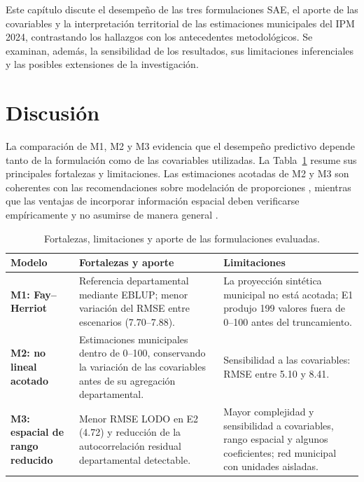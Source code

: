 \label{sec:discusion}

Este capítulo discute el desempeño de las tres formulaciones SAE, el aporte de las covariables y la interpretación territorial de las estimaciones municipales del IPM 2024, contrastando los hallazgos con los antecedentes metodológicos. Se examinan, además, la sensibilidad de los resultados, sus limitaciones inferenciales y las posibles extensiones de la investigación.

\section{Discusión}
\label{sec:discusion-resultados}

La comparación de M1, M2 y M3 evidencia que el desempeño predictivo depende tanto de la formulación como de las covariables utilizadas. La Tabla~\ref{tab:comparativa_modelos} resume sus principales fortalezas y limitaciones. Las estimaciones acotadas de M2 y M3 son coherentes con las recomendaciones sobre modelación de proporciones \cite{Janicki_2020,MolinaRao_2010,RaoMolina_2015}, mientras que las ventajas de incorporar información espacial deben verificarse empíricamente y no asumirse de manera general \cite{PratesiSalvati_2008,PratesiSalvati_2019}.

\begin{table}[!htbp]
\centering
\footnotesize
\caption{Fortalezas, limitaciones y aporte de las formulaciones evaluadas.}
\label{tab:comparativa_modelos}
\renewcommand{\arraystretch}{1.1}
\setlength{\tabcolsep}{4pt}

\begin{tabularx}{\textwidth}{p{2.2cm} X X}
\toprule
\textbf{Modelo} &
\textbf{Fortalezas y aporte} &
\textbf{Limitaciones} \\
\midrule

\textbf{M1: Fay--Herriot} &
Referencia departamental mediante EBLUP; menor variación del RMSE entre escenarios (7.70--7.88). &
La proyección sintética municipal no está acotada; E1 produjo 199 valores fuera de 0--100 antes del truncamiento. \\

\addlinespace

\textbf{M2: no lineal acotado} &
Estimaciones municipales dentro de 0--100, conservando la variación de las covariables antes de su agregación departamental. &
Sensibilidad a las covariables: RMSE entre 5.10 y 8.41. \\

\addlinespace

\textbf{M3: espacial de rango reducido} &
Menor RMSE LODO en E2 (4.72) y reducción de la autocorrelación residual departamental detectable. &
Mayor complejidad y sensibilidad a covariables, rango espacial y algunos coeficientes; red municipal con unidades aisladas. \\

\bottomrule
\end{tabularx}
\end{table}

